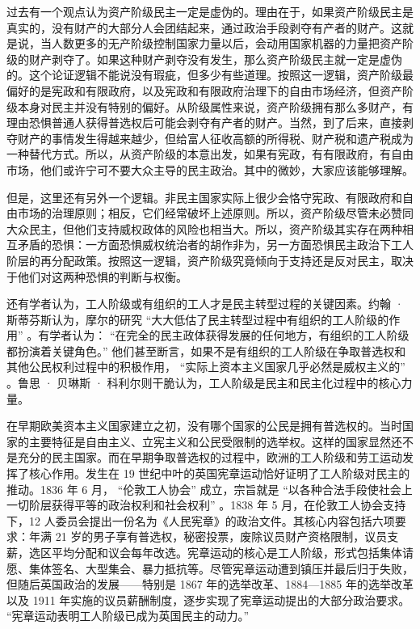 过去有一个观点认为资产阶级民主一定是虚伪的。理由在于，如果资产阶级民主是真实的，没有财产的大部分人会团结起来，通过政治手段剥夺有产者的财产。这就是说，当人数更多的无产阶级控制国家力量以后，会动用国家机器的力量把资产阶级的财产剥夺了。如果这种财产剥夺没有发生，那么资产阶级民主就一定是虚伪的。这个论证逻辑不能说没有瑕疵，但多少有些道理。按照这一逻辑，资产阶级最偏好的是宪政和有限政府，以及宪政和有限政府治理下的自由市场经济，但资产阶级本身对民主并没有特别的偏好。从阶级属性来说，资产阶级拥有那么多财产，有理由恐惧普通人获得普选权后可能会剥夺有产者的财产。当然，到了后来，直接剥夺财产的事情发生得越来越少，但给富人征收高额的所得税、财产税和遗产税成为一种替代方式。所以，从资产阶级的本意出发，如果有宪政，有有限政府，有自由市场，他们或许宁可不要大众主导的民主政治。其中的微妙，大家应该能够理解。

但是，这里还有另外一个逻辑。非民主国家实际上很少会恪守宪政、有限政府和自由市场的治理原则；相反，它们经常破坏上述原则。所以，资产阶级尽管未必赞同大众民主，但他们支持威权政体的风险也相当大。所以，资产阶级其实存在两种相互矛盾的恐惧：一方面恐惧威权统治者的胡作非为，另一方面恐惧民主政治下工人阶层的再分配政策。按照这一逻辑，资产阶级究竟倾向于支持还是反对民主，取决于他们对这两种恐惧的判断与权衡。

还有学者认为，工人阶级或有组织的工人才是民主转型过程的关键因素。约翰 · 斯蒂芬斯认为，摩尔的研究 “大大低估了民主转型过程中有组织的工人阶级的作用” 。有学者认为： “在完全的民主政体获得发展的任何地方，有组织的工人阶级都扮演着关键角色。” 他们甚至断言，如果不是有组织的工人阶级在争取普选权和其他公民权利过程中的积极作用， “实际上资本主义国家几乎必然是威权主义的” 。鲁思 · 贝琳斯 · 科利尔则干脆认为，工人阶级是民主和民主化过程中的核心力量。

在早期欧美资本主义国家建立之初，没有哪个国家的公民是拥有普选权的。当时国家的主要特征是自由主义、立宪主义和公民受限制的选举权。这样的国家显然还不是充分的民主国家。而在早期争取普选权的过程中，欧洲的工人阶级和劳工运动发挥了核心作用。发生在 19 世纪中叶的英国宪章运动恰好证明了工人阶级对民主的推动。1836 年 6 月， “伦敦工人协会” 成立，宗旨就是 “以各种合法手段使社会上一切阶层获得平等的政治权利和社会权利” 。1838 年 5 月，在伦敦工人协会支持下，12 人委员会提出一份名为《人民宪章》的政治文件。其核心内容包括六项要求：年满 21 岁的男子享有普选权，秘密投票，废除议员财产资格限制，议员支薪，选区平均分配和议会每年改选。宪章运动的核心是工人阶级，形式包括集体请愿、集体签名、大型集会、暴力抵抗等。尽管宪章运动遭到镇压并最后归于失败，但随后英国政治的发展——特别是 1867 年的选举改革、1884—1885 年的选举改革以及 1911 年实施的议员薪酬制度，逐步实现了宪章运动提出的大部分政治要求。 “宪章运动表明工人阶级已成为英国民主的动力。” 

